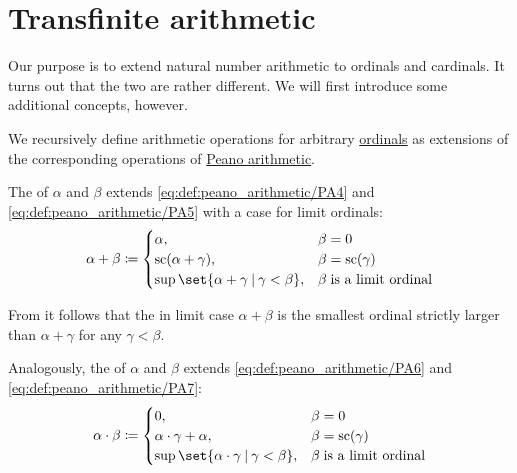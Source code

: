 \section{Transfinite arithmetic}\label{sec:transfinite_arithmetic}

Our purpose is to extend natural number arithmetic to ordinals and cardinals. It turns out that the two are rather different. We will first introduce some additional concepts, however.

\begin{definition}\label{def:ordinal_arithmetic}
  We recursively define arithmetic operations for arbitrary \hyperref[def:ordinal]{ordinals} as extensions of the corresponding operations of \hyperref[def:peano_arithmetic]{Peano arithmetic}.

  \begin{thmenum}
     The  of \( \alpha \) and \( \beta \) extends \eqref{eq:def:peano_arithmetic/PA4} and \eqref{eq:def:peano_arithmetic/PA5} with a case for limit ordinals:
    \begin{equation}\label{eq:def:ordinal_arithmetic/addition}
      \alpha + \beta \coloneqq \begin{cases}
        \alpha,                                            &\beta = 0 \\
        \op{sc}(\alpha + \gamma),                          &\beta = \op{sc}(\gamma) \\
        \sup\set{ \alpha + \gamma \given \gamma < \beta }, &\beta \T{is a limit ordinal} \\
      \end{cases}
    \end{equation}

    From  it follows that the in limit case \( \alpha + \beta \) is the smallest ordinal strictly larger than \( \alpha + \gamma \) for any \( \gamma < \beta \).

     Analogously, the  of \( \alpha \) and \( \beta \) extends \eqref{eq:def:peano_arithmetic/PA6} and \eqref{eq:def:peano_arithmetic/PA7}:
    \begin{equation}\label{eq:def:ordinal_arithmetic/multiplication}
      \alpha \cdot \beta \coloneqq \begin{cases}
        0,                                                     &\beta = 0 \\
        \alpha \cdot \gamma + \alpha,                          &\beta = \op{sc}(\gamma) \\
        \sup\set{ \alpha \cdot \gamma \given \gamma < \beta }, &\beta \T{is a limit ordinal} \\
      \end{cases}
    \end{equation}


\end{thmenum}
\end{definition}
